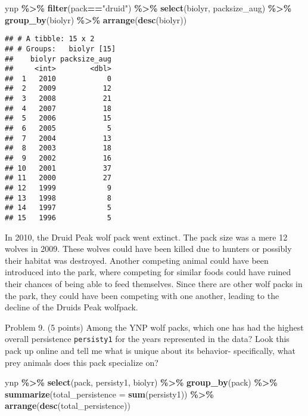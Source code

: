 \documentclass[
]{article}
\newenvironment{Shaded}{\begin{snugshade}}{\end{snugshade}}
\newcommand{\AttributeTok}[1]{\textcolor[rgb]{0.13,0.29,0.53}{#1}}
\newcommand{\FunctionTok}[1]{\textcolor[rgb]{0.13,0.29,0.53}{\textbf{#1}}}
\newcommand{\NormalTok}[1]{#1}
\newcommand{\SpecialCharTok}[1]{\textcolor[rgb]{0.81,0.36,0.00}{\textbf{#1}}}
\newcommand{\StringTok}[1]{\textcolor[rgb]{0.31,0.60,0.02}{#1}}
\begin{document}
\begin{Shaded}
\begin{Highlighting}[]
\NormalTok{ynp }\SpecialCharTok{\%\textgreater{}\%} 
  \FunctionTok{filter}\NormalTok{(pack}\SpecialCharTok{==}\StringTok{"druid"}\NormalTok{) }\SpecialCharTok{\%\textgreater{}\%} 
  \FunctionTok{select}\NormalTok{(biolyr, packsize\_aug) }\SpecialCharTok{\%\textgreater{}\%} 
  \FunctionTok{group\_by}\NormalTok{(biolyr) }\SpecialCharTok{\%\textgreater{}\%} 
  \FunctionTok{arrange}\NormalTok{(}\FunctionTok{desc}\NormalTok{(biolyr))}
\end{Highlighting}
\end{Shaded}

\begin{verbatim}
## # A tibble: 15 x 2
## # Groups:   biolyr [15]
##    biolyr packsize_aug
##     <int>        <dbl>
##  1   2010            0
##  2   2009           12
##  3   2008           21
##  4   2007           18
##  5   2006           15
##  6   2005            5
##  7   2004           13
##  8   2003           18
##  9   2002           16
## 10   2001           37
## 11   2000           27
## 12   1999            9
## 13   1998            8
## 14   1997            5
## 15   1996            5
\end{verbatim}

In 2010, the Druid Peak wolf pack went extinct. The pack size was a mere
12 wolves in 2009. These wolves could have been killed due to hunters or
possibly their habitat was destroyed. Another competing animal could
have been introduced into the park, where competing for similar foods
could have ruined their chances of being able to feed themselves. Since
there are other wolf packs in the park, they could have been competing
with one another, leading to the decline of the Druids Peak wolfpack.

Problem 9. (5 points) Among the YNP wolf packs, which one has had the
highest overall persistence \texttt{persisty1} for the years represented
in the data? Look this pack up online and tell me what is unique about
its behavior- specifically, what prey animals does this pack specialize
on?

\begin{Shaded}
\begin{Highlighting}[]
\NormalTok{ynp }\SpecialCharTok{\%\textgreater{}\%}
  \FunctionTok{select}\NormalTok{(pack, persisty1, biolyr) }\SpecialCharTok{\%\textgreater{}\%} 
  \FunctionTok{group\_by}\NormalTok{(pack) }\SpecialCharTok{\%\textgreater{}\%}
  \FunctionTok{summarize}\NormalTok{(}\AttributeTok{total\_persistence =} \FunctionTok{sum}\NormalTok{(persisty1)) }\SpecialCharTok{\%\textgreater{}\%}
  \FunctionTok{arrange}\NormalTok{(}\FunctionTok{desc}\NormalTok{(total\_persistence))  }
\end{Highlighting}
\end{Shaded}
\end{document}

